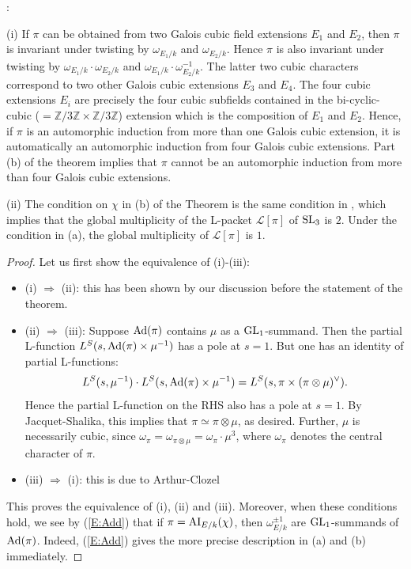 \documentclass[11pt]{amsart}
\theoremstyle{plain}
\numberwithin{equation}{section}
\newcommand{\Z}{\mathbb Z}
\def\SL{{\rm SL}}
\def\GL{{\rm GL}}
\def\Z{{\mathbb Z}}
\begin{document}
:
\vskip 5pt

\noindent (i)  If $\pi$ can be obtained from two Galois cubic field extensions $E_1$ and $E_2$, then $\pi$ is invariant under twisting by $\omega_{E_1/k}$ and $\omega_{E_2/k}$. Hence $\pi$ is also invariant under twisting by $\omega_{E_1/k} \cdot \omega_{E_2/k}$ and $\omega_{E_1/k} \cdot \omega_{E_2/k}^{-1}$.  The latter two cubic characters correspond to two other Galois cubic extensions $E_3$ and $E_4$. The four cubic extensions $E_i$ are precisely the four cubic subfields contained in the bi-cyclic-cubic ($=\Z/3\Z \times \Z/3\Z$) extension which is the composition of $E_1$ and $E_2$.  Hence, if $\pi$ is an automorphic induction from more than one Galois cubic extension, it is automatically an automorphic induction from four Galois cubic extensions. Part  (b) of the theorem implies  that $\pi$ cannot be an automorphic induction from more than four Galois cubic extensions.
\vskip 5pt

\noindent (ii) The condition on $\chi$  in (b) of the Theorem  is the same condition in \cite[\S 6.1, Prop. 2 (1)] {L1}, which implies that the global multiplicity of the L-packet $\mathcal{L}[\pi]$ of $\SL_3$ is $2$. Under the condition in (a), the global multiplicity of $\mathcal{L}[\pi]$ is $1$.

\vskip 5pt


\begin{proof}
Let us first show the equivalence of (i)-(iii):
\vskip 5pt

\begin{itemize}
\item (i) $\Longrightarrow$ (ii): this has been shown by our discussion before the statement of the theorem.
\vskip 5pt

\item (ii) $\Longrightarrow$ (iii): Suppose ${\rm Ad}(\pi)$ contains $\mu$ as a $\GL_1$-summand. Then the partial L-function $L^S(s, {\rm Ad}(\pi) \times \mu^{-1})$ has a pole at $s = 1$. But one has an identity of partial L-functions:
\[  L^S(s, \mu^{-1}) \cdot L^S(s, {\rm Ad}(\pi) \times \mu^{-1}) = L^S(s, \pi \times (\pi \otimes \mu)^{\vee}). \]
Hence the partial L-function on the RHS also has a pole at $s=1$. By Jacquet-Shalika, this implies that $\pi \simeq \pi \otimes \mu$, as desired. 
Further, $\mu$ is necessarily cubic, since $\omega_{\pi} = \omega_{\pi \otimes \mu} = \omega_{\pi} \cdot \mu^3$, where $\omega_{\pi}$ denotes the central character of $\pi$.
\vskip 5pt

\item  (iii) $\Longrightarrow$ (i): this is due to Arthur-Clozel \cite{AC}
\end{itemize}
This proves the equivalence of (i), (ii) and (iii). Moreover, when these conditions hold, we see by (\ref{E:Add}) that if $\pi ={\rm AI}_{E/k}(\chi)$, then $\omega_{E/k}^{\pm 1}$ are $\GL_1$-summands of ${\rm Ad}(\pi)$. Indeed, (\ref{E:Add}) gives the more precise description in (a) and (b) immediately. 

\end{proof}
\end{document}
